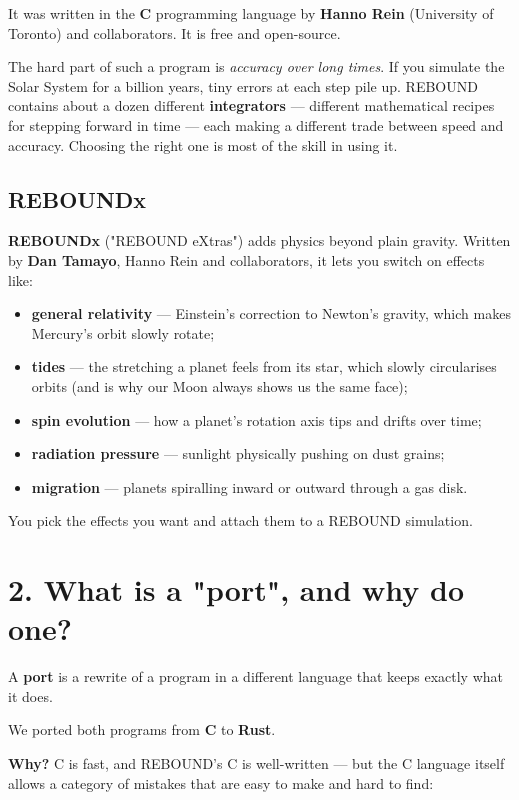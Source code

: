 \documentclass[11pt]{article}
\begin{document}
It was written in the \textbf{C} programming language by \textbf{Hanno Rein} (University of Toronto) and collaborators. It is free and open-source.

The hard part of such a program is \emph{accuracy over long times}. If you simulate the Solar System for a billion years, tiny errors at each step pile up. REBOUND contains about a dozen different \textbf{integrators} --- different mathematical recipes for stepping forward in time --- each making a different trade between speed and accuracy. Choosing the right one is most of the skill in using it.

\subsection{REBOUNDx}

\textbf{REBOUNDx} ("REBOUND eXtras") adds physics beyond plain gravity. Written by \textbf{Dan Tamayo}, Hanno Rein and collaborators, it lets you switch on effects like:

\begin{itemize}
\item \textbf{general relativity} --- Einstein's correction to Newton's gravity, which makes Mercury's orbit slowly rotate;
\item \textbf{tides} --- the stretching a planet feels from its star, which slowly circularises orbits (and is why our Moon always shows us the same face);
\item \textbf{spin evolution} --- how a planet's rotation axis tips and drifts over time;
\item \textbf{radiation pressure} --- sunlight physically pushing on dust grains;
\item \textbf{migration} --- planets spiralling inward or outward through a gas disk.
\end{itemize}

You pick the effects you want and attach them to a REBOUND simulation.

\section{2. What is a "port", and why do one?}

A \textbf{port} is a rewrite of a program in a different language that keeps exactly what it does.

We ported both programs from \textbf{C} to \textbf{Rust}.

\textbf{Why?} C is fast, and REBOUND's C is well-written --- but the C language itself allows a category of mistakes that are easy to make and hard to find:
\end{document}
